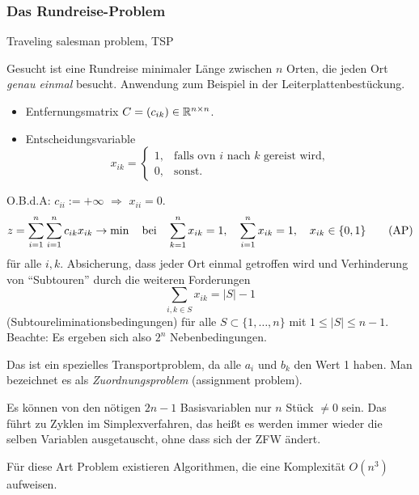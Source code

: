 \subsubsection{Das Rundreise-Problem}
Traveling salesman problem, TSP

Gesucht ist eine Rundreise minimaler Länge zwischen $n$ Orten, die jeden Ort
\emph{genau einmal} besucht. Anwendung zum Beispiel in der
Leiterplattenbestückung.

\begin{itemize}
\item Entfernungsmatrix $C = (c_{ik}) \in \mathbb{R}^{n \times n}$.
\item Entscheidungsvariable
  \[ x_{ik} =
    \begin{cases}
      1, &\text{falls ovn $i$ nach $k$ gereist wird,} \\
      0, &\text{sonst.}
    \end{cases}
  \]
\end{itemize}
O.B.d.A: $c_{ii} := + \infty$ $\Rightarrow$ $x_{ii} = 0$.
\[ z = \sum_{i=1}^n \sum_{i=1}^n c_{ik} x_{ik} \to \min \quad \text{bei} \quad
  \sum_{k=1}^n x_{ik} = 1, \quad
  \sum_{i=1}^n x_{ik} = 1, \quad
  x_{ik} \in \{0,1\} \tag{AP} \]
für alle $i,k$. Absicherung, dass jeder Ort einmal getroffen wird und
Verhinderung von ``Subtouren'' durch die weiteren Forderungen
\[ \sum_{i,k \in S} x_{ik} = |S| - 1 \tag{SEB} \]
(Subtoureliminationsbedingungen)
für alle $S \subset \{1, \ldots, n\}$ mit $1 \le |S| \le n-1$. Beachte: Es
ergeben sich also $2^n$ Nebenbedingungen.

Das ist ein spezielles Transportproblem, da alle $a_i$ und $b_k$ den Wert 1
haben. Man bezeichnet es als \emph{Zuordnungsproblem} (assignment problem).

Es können von den nötigen $2n-1$ Basisvariablen nur $n$ Stück $\ne 0$
sein. Das führt zu Zyklen im Simplexverfahren, das heißt es werden immer
wieder die selben Variablen ausgetauscht, ohne dass sich der ZFW ändert.

Für diese Art Problem existieren Algorithmen, die eine Komplexität $O(n^3)$
aufweisen.

